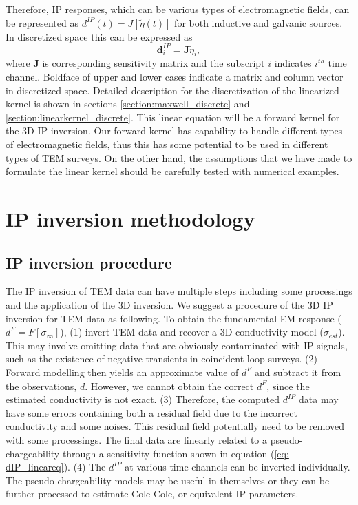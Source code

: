 \documentclass[a4paper, 11pt]{article}
\newcommand{\siginf}{\sigma_\infty}
\newcommand{\peta}{\tilde{\eta}}
\newcommand{\dip}{d^{IP}}
\begin{document}
Therefore, IP responses, which can be various types of electromagnetic fields, can be represented as $\dip(t) = J[\peta(t)]$ for both inductive and galvanic sources. In discretized space this can be expressed as
\begin{equation}
  \mathbf{d}^{IP}_i = \mathbf{J}\peta_i,
  \label{eq: dIP_lineareq}
\end{equation}
where $\mathbf{J}$ is corresponding sensitivity matrix and the subscript $i$ indicates $i^{th}$ time channel. 
Boldface of upper and lower cases indicate a matrix and column vector in discretized space. 
Detailed description for the discretization of the linearized kernel is shown in sections \ref{section:maxwell_discrete} and \ref{section:linearkernel_discrete}. 
This linear equation will be a forward kernel for the 3D IP inversion. 
Our forward kernel has capability to handle different types of electromagnetic fields, thus this has some potential to be used in different types of TEM surveys. 
On the other hand, the assumptions that we have made to formulate the linear kernel should be carefully tested with numerical examples.


\section{IP inversion methodology}

\subsection{IP inversion procedure}
The IP inversion of TEM data can have multiple steps including some processings and the application of the 3D inversion. We suggest a procedure of the 3D IP inversion for TEM data as following.
To obtain the fundamental EM response ($d^F = F[\siginf]$), (1) invert TEM data and recover a 3D conductivity model ($\sigma_{est}$). 
This may involve omitting data that are obviously contaminated with IP signals, such as the existence of negative transients in coincident loop surveys. 
(2) Forward modelling then yields an approximate value of $d^F$ and subtract it from the observations, $d$. 
However, we cannot obtain the correct $d^F$, since the estimated conductivity is not exact. 
(3) Therefore, the computed $\dip$ data may have some errors containing both a residual field due to the incorrect conductivity and some noises. This residual field potentially need to be removed with some processings. 
The final data are linearly related to a pseudo-chargeability through a sensitivity function shown in equation (\ref{eq: dIP_lineareq}). 
(4) The $\dip$ at various time channels can be inverted individually. The pseudo-chargeability models may be useful in themselves or they can be further processed to estimate Cole-Cole, or equivalent IP parameters.
\end{document}
